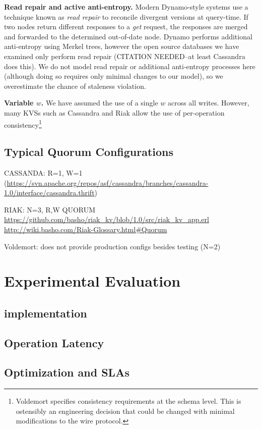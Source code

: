 \documentclass{vldb}
\begin{document}
\textbf{Read repair and active anti-entropy.} Modern Dynamo-style
systems use a technique known as \textit{read repair} to reconcile
divergent versions at query-time.  If two nodes return different
responses to a \textit{get} request, the responses are merged and
forwarded to the determined out-of-date node.  Dynamo performs
additional anti-entropy using Merkel trees, however the open source
databases we have examined only perform read repair (CITATION
NEEDED--at least Cassandra does this). We do not model read repair or
additional anti-entropy processes here (although doing so requires
only minimal changes to our model), so we overestimate the chance of
staleness violation.

\textbf{Variable $w$.} We have assumed the use of a single $w$ across
all writes.  However, many KVSs such as Cassandra and Riak allow the
use of per-operation consistency\footnote{Voldemort specifies
  consistency requirements at the schema level. This is ostensibly an
  engineering decision that could be changed with minimal
  modifications to the wire protocol.}

\subsection{Typical Quorum Configurations}

CASSANDA: R=1, W=1 (\url{https://svn.apache.org/repos/asf/cassandra/branches/cassandra-1.0/interface/cassandra.thrift})

RIAK: N=3, R,W QUORUM \url{https://github.com/basho/riak_kv/blob/1.0/src/riak_kv_app.erl}
\url{http://wiki.basho.com/Riak-Glossary.html#Quorum}

Voldemort: does not provide production configs besides testing (N=2)

\section{Experimental Evaluation}
\label{sec:implement}

\subsection{implementation}

\subsection{Operation Latency}
\label{sec:real-latency}

\subsection{Optimization and SLAs}
\label{sec:optimization}
\end{document}
